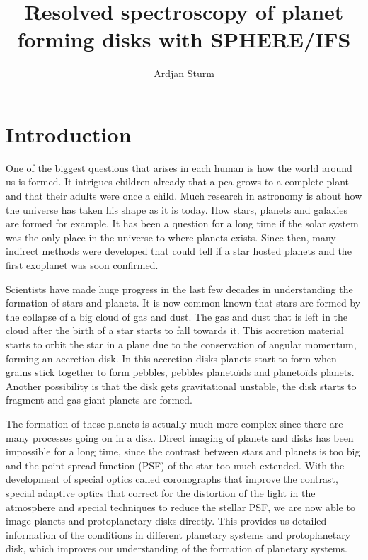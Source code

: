 \documentclass[twoside,single]{lion-msc}
\title{Resolved spectroscopy of planet forming disks with SPHERE/IFS}
\author{Ardjan Sturm}
\affiliation{Huygens-Kamerlingh Onnes Laboratory, Leiden University}   %
\begin{document}

\maketitle

\tableofcontents
\cleardoublepage



\chapter{Introduction}
One of the biggest questions that arises in each human is how the world around us is formed. It intrigues children already that a pea grows to a complete plant and that their adults were once a child. Much research in astronomy is about how the universe has taken his shape as it is today. How stars, planets and galaxies are formed for example. It has been a question for a long time if the solar system was the only place in the universe to where planets exists. Since then, many indirect methods were developed that could tell if a star hosted planets and the first exoplanet was soon confirmed.
\bigskip

Scientists have made huge progress in the last few decades in understanding the formation of stars and planets. It is now common known that stars are formed by the collapse of a big cloud of gas and dust. The gas and dust that is left in the cloud after the birth of a star starts to fall towards it. This accretion material starts to orbit the star in a plane due to the conservation of angular momentum, forming an accretion disk. In this accretion disks planets start to form when grains stick together to form pebbles, pebbles planeto\"ids and planeto\"ids planets. Another possibility is that the disk gets gravitational unstable, the disk starts to fragment and gas giant planets are formed. %
\bigskip

The formation of these planets is actually much more complex since there are many processes going on in a disk. Direct imaging of planets and disks has been impossible for a long time, since the contrast between stars and planets is too big and the point spread function (PSF) of the star too much extended. With the development of special optics called coronographs that improve the contrast, special adaptive optics that correct for the distortion of the light in the atmosphere and special techniques to reduce the stellar PSF, we are now able to image planets and protoplanetary disks directly. This provides us detailed information of the conditions in different planetary systems and protoplanetary disk, which improves our understanding of the formation of planetary systems.
\bigskip
\end{document}
